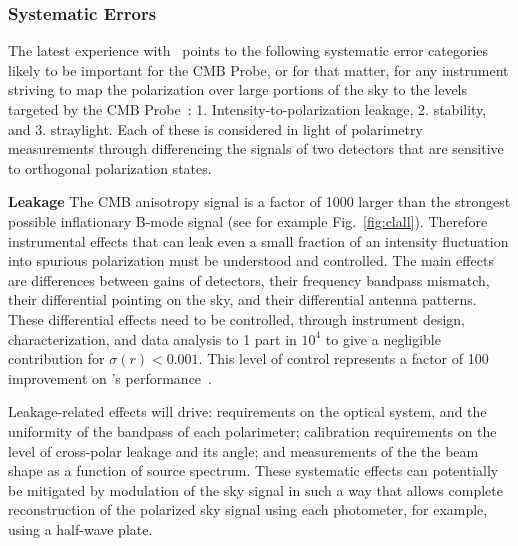 
\subsubsection{Systematic Errors}
\vspace{-0.05in}

The latest experience with \planck\ points to the following systematic error categories likely to be important for 
the CMB Probe, or for that matter, for any instrument striving to map the polarization 
over large portions of the sky to the levels targeted by the CMB Probe~\cite{planck2016_xlvi}:
1. Intensity-to-polarization leakage, 2. stability, and 3. straylight. 
Each of these is considered in light of polarimetry measurements through
differencing the signals of two detectors that are sensitive to orthogonal polarization states. 

\textbf{Leakage} \hspace{0.1in} The CMB anisotropy signal is a factor of 1000 larger 
than the strongest possible inflationary B-mode signal (see for example Fig.~\ref{fig:clall}). 
Therefore instrumental effects that can leak
even a small fraction of an intensity fluctuation into spurious  polarization
must be understood and controlled. The main effects are differences between gains of detectors, 
their frequency bandpass mismatch, their differential pointing on the sky, 
and their differential antenna patterns. These differential effects need to be controlled, through 
instrument design, characterization, and data analysis to 1 part in $10^{4}$ to give a negligible contribution for 
$\sigma(r) <0.001$.  This level of control represents a factor of 100 improvement on \planck 's performance~\cite{planck2016_xlvi}. 

Leakage-related effects will drive: requirements on the optical system, and the uniformity of the
bandpass of each polarimeter;  calibration requirements on the level of cross-polar leakage and its angle; 
and measurements of the the beam shape as a function of source spectrum. 
These systematic effects can potentially be mitigated by modulation of the sky signal in
such a way that allows complete reconstruction of the 
polarized sky signal using each photometer, for example, using a
half-wave plate.  

